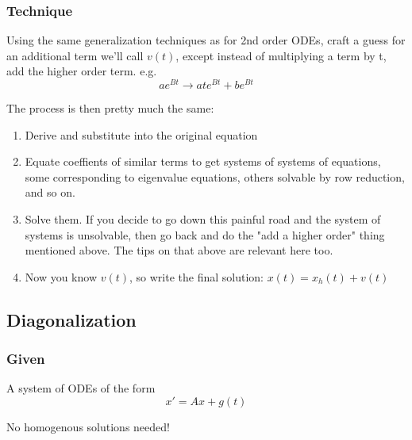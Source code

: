 \documentclass[11pt]{article}
\begin{document}
\subsubsection{Technique}
Using the same generalization techniques as for 2nd order ODEs, craft a guess for an additional
term we'll call $v(t)$, except instead of multiplying a term by t, add the higher order term. e.g.
\[ ae^{Bt} \rightarrow ate^{Bt} + be^{Bt} \]

The process is then pretty much the same:
\begin{enumerate}
    \item Derive and substitute into the original equation
    \item Equate coeffients of similar terms to get systems of systems of equations, 
          some corresponding to eigenvalue equations, others solvable by row reduction, 
          and so on. 
    \item Solve them. If you decide to go down this painful road and the system of systems is
          unsolvable, then go back and do the "add a higher order" thing mentioned above. The
          tips on that above are relevant here too.
    \item Now you know $v(t)$, so write the final solution: $x(t) = x_h(t) + v(t)$
\end{enumerate}
\subsection{Diagonalization}
\subsubsection{Given}
A system of ODEs of the form
\[ x' = Ax + g(t) \]

No homogenous solutions needed!
\end{document}
